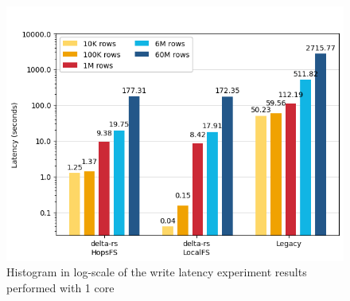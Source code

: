 \begin{figure}
\begin{minipage}[b]{\textwidth}
\begin{tabular}{c r S[table-format=4.5] S[table-format=2.2] S[table-format=2.2] S[table-format=2.2]}
            \bottomrule
        \end{tabular}
    \end{minipage}
    \begin{minipage}[b]{\textwidth}
        \centering
        \includegraphics[width=\textwidth]{figures/5-results/write/write_time_1_core.png}
        \caption{Histogram in log-scale of the write latency experiment results performed with 1  core}
        \label{fig:res_write_time}
    \end{minipage}
\end{figure}

